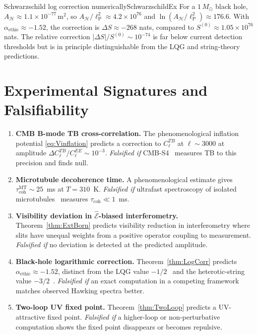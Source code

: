 \documentclass[11pt,a4paper]{article}
\theoremstyle{myrmk}
\newcommand{\lP}{\ell_{\mathrm{P}}}
\newcommand{\Ehat}{\hat{\mathcal{E}}}
\begin{document}
\begin{example}{Schwarzschild log correction numerically}{SchwarzschildEx}
For a $1\,M_\odot$ black hole, $A_{\mathcal{H}}\approx 1.1\times 10^{-77}\,\text{m}^2$,
so $A_{\mathcal{H}}/\lP^2\approx 4.2\times 10^{76}$ and $\ln(A_{\mathcal{H}}/\lP^2)\approx 176.6$.
With $\alpha_{\mathrm{ethic}}\approx-1.52$, the correction is $\Delta S\approx -268$
nats, compared to $S^{(0)}\approx 1.05\times 10^{76}$ nats. The relative correction
$|\Delta S|/S^{(0)}\sim 10^{-74}$ is far below current detection thresholds but is in
principle distinguishable from the LQG and string-theory predictions.
\end{example}

\section{Experimental Signatures and Falsifiability}
\label{sec:experiments}

\begin{enumerate}[label=\textbf{E\arabic*.},leftmargin=*,itemsep=4pt]
  \item \textbf{CMB B-mode TB cross-correlation.} The phenomenological inflation
    potential \eqref{eq:Vinflation} predicts a correction to $C^{TB}_\ell$ at
    $\ell\sim 3000$ at amplitude $\Delta C^{TB}_\ell/C^{EE}_\ell\sim 10^{-3}$.
    \emph{Falsified if} CMB-S4~\cite{CMBS4} measures TB to this precision and finds
    null.
  \item \textbf{Microtubule decoherence time.} A phenomenological estimate gives
    $\tau_{\mathrm{coh}}^{\mathrm{MT}}\sim 25$~ms at $T=310$~K. \emph{Falsified if}
    ultrafast spectroscopy of isolated microtubules~\cite{Engel2007} measures
    $\tau_{\mathrm{coh}}\ll 1$~ms.
  \item \textbf{Visibility deviation in $\Ehat$-biased interferometry.}
    Theorem~\ref{thm:ExtBorn} predicts visibility reduction in interferometry where
    slits have unequal weights from a positive operator coupling to measurement.
    \emph{Falsified if} no deviation is detected at the predicted amplitude.
  \item \textbf{Black-hole logarithmic correction.} Theorem~\ref{thm:LogCorr} predicts
    $\alpha_{\mathrm{ethic}}\approx -1.52$, distinct from the LQG value $-1/2$~\cite{KaulMajumdar1998}
    and the heterotic-string value $-3/2$~\cite{SenStringBH2012}. \emph{Falsified if}
    an exact computation in a competing framework matches observed Hawking spectra better.
  \item \textbf{Two-loop UV fixed point.} Theorem~\ref{thm:TwoLoop} predicts a
    UV-attractive fixed point. \emph{Falsified if} a higher-loop or non-perturbative
    computation shows the fixed point disappears or becomes repulsive.
\end{enumerate}
\end{document}
